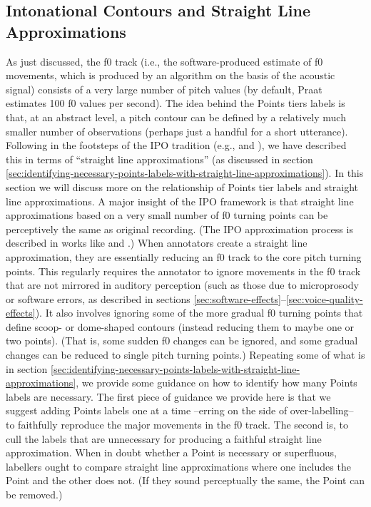 \documentclass[11pt, twoside]{memoir}
\begin{document}
\subsection{Intonational Contours and Straight Line Approximations}\label{sec:intonational-contours-and-straight-line-approximations}
As just discussed, the f0 track (i.e., the software-produced estimate of f0 movements, which is produced by an algorithm on the basis of the acoustic signal) consists of a very large number of pitch values (by default, Praat estimates 100 f0 values per second). The idea behind the Points tiers labels is that, at an abstract level, a pitch contour can be defined by a relatively much smaller number of observations (perhaps just a handful for a short utterance). Following in the footsteps of the IPO tradition (e.g., \citealt{t-hartcollier75} and \citealt{t-hart-90}), we have described this in terms of “straight line approximations” (as discussed in section \ref{sec:identifying-necessary-points-labels-with-straight-line-approximations}). In this section we will discuss more on the relationship of Points tier labels and straight line approximations.
A major insight of the IPO framework is that straight line approximations based on a very small number of f0 turning points can be perceptively the same as original recording. (The IPO approximation process is described in works like \citealt{dutoit97} and \citealt{rao12}.) When annotators create a straight line approximation, they are essentially reducing an f0 track to the core pitch turning points. This regularly requires the annotator to ignore movements in the f0 track that are not mirrored in auditory perception (such as those due to microprosody or software errors, as described in sections \ref{sec:software-effects}–\ref{sec:voice-quality-effects}). It also involves ignoring some of the more gradual f0 turning points that define scoop- or dome-shaped contours (instead reducing them to maybe one or two points). (That is, some sudden f0 changes can be ignored, and some gradual changes can be reduced to single pitch turning points.) Repeating some of what is in section \ref{sec:identifying-necessary-points-labels-with-straight-line-approximations}, we provide some guidance on how to identify how many Points labels are necessary. The first piece of guidance we provide here is that we suggest adding Points labels one at a time –erring on the side of over-labelling– to faithfully reproduce the major movements in the f0 track. The second is, to cull the labels that are unnecessary for producing a faithful straight line approximation. When in doubt whether a Point is necessary or superfluous, labellers ought to compare straight line approximations where one includes the Point and the other does not. (If they sound perceptually the same, the Point can be removed.) 
\end{document}
